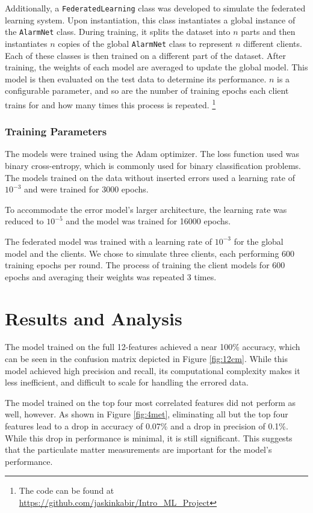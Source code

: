 \documentclass[conference]{IEEEtran}
\begin{document}
Additionally, a \texttt{FederatedLearning} class was
developed to simulate the federated learning system. Upon
instantiation, this class instantiates a global instance of
the \texttt{AlarmNet} class. During training, it splits the
dataset into $n$ parts and then instantiates $n$ copies of
the global \texttt{AlarmNet} class to represent $n$
different clients. Each of these classes is then trained on
a different part of the dataset. After training, the weights
of each model are  averaged to update the global model. This
model is then evaluated on the test data to determine its
performance. $n$ is a configurable parameter, and so are the
number of training epochs each client trains for and how
many times this process is repeated. \footnote{The code can
be found at
\url{https://github.com/jaskinkabir/Intro_ML_Project}}

\subsubsection{Training Parameters}
The models were trained using the Adam optimizer. The loss
function used was binary cross-entropy, which is commonly
used for binary classification problems. The models trained
on the data without inserted errors used a learning rate of
$10^{-3}$ and were trained for 3000 epochs. 

To accommodate the error model's larger architecture, the
learning rate was reduced to $10^{-5}$ and the model was
trained for 16000 epochs. 

The federated model was trained with a learning rate of
$10^{-3}$ for the global model and the clients. We chose to
simulate three clients, each performing 600 training epochs
per round. The process of training the client models for 600
epochs and averaging their weights was repeated 3 times.

\section{Results and Analysis}
The model trained on the full 12-features achieved a near
100\% accuracy, which can be seen in the confusion matrix
depicted in Figure \ref{fig:12cm}. While this model achieved
high precision and recall, its computational complexity
makes it less inefficient, and difficult to scale for
handling the errored data. 

The model trained on the top four most correlated features
did not perform as well, however. As shown in Figure
\ref{fig:4met}, eliminating all but the top four features
lead to a drop in accuracy of 0.07\% and a drop in precision
of 0.1\%. While this drop in performance is minimal, it is
still significant. This suggests that the particulate matter
measurements are important for the model's performance. 
\end{document}
